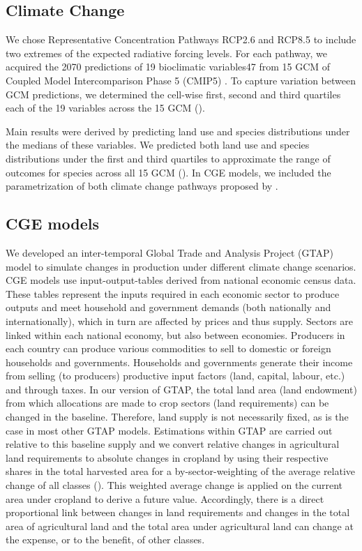\documentclass[titlesmallcaps,copyrightpage]{uomthesis}\usepackage[]{graphicx}\usepackage[]{color}
\begin{document}
\subsection{Climate Change} 
We chose Representative Concentration Pathways RCP2.6 and RCP8.5 \citep{van_vuuren_representative_2011} to include two extremes of the expected radiative forcing levels. For each pathway, we acquired the 2070 predictions of 19 bioclimatic variables47 from 15 GCM of Coupled Model Intercomparison Phase 5 (CMIP5) \citep{taylor_overview_2012}. To capture variation between GCM predictions, we determined the cell-wise first, second and third quartiles each of the 19 variables across the 15 GCM ().

Main results were derived by predicting land use and species distributions under the medians of these variables. We predicted both land use and species distributions under the first and third quartiles to approximate the range of outcomes for species across all 15 GCM (). In CGE models, we included the parametrization of both climate change pathways proposed by \citet{roson_estimation_2016}.

\subsection{CGE models} 
We developed an inter-temporal Global Trade and Analysis Project (GTAP) model \citep{hertel_global_1997} to simulate changes in production under different climate change scenarios. CGE models use input-output-tables derived from national economic census data. These tables represent the inputs required in each economic sector to produce outputs and meet household and government demands (both nationally and internationally), which in turn are affected by prices and thus supply. Sectors are linked within each national economy, but also between economies. Producers in each country can produce various commodities to sell to domestic or foreign households and governments. Households and governments generate their income from selling (to producers) productive input factors (land, capital, labour, etc.) and through taxes. In our version of GTAP, the total land area (land endowment) from which allocations are made to crop sectors (land requirements) can be changed in the baseline. Therefore, land supply is not necessarily fixed, as is the case in most other GTAP models.  
Estimations within GTAP are carried out relative to this baseline supply and we convert relative changes in agricultural land requirements to absolute changes in cropland by using their respective shares in the total harvested area for a by-sector-weighting of the average relative change of all classes (). This weighted average change is applied on the current area under cropland to derive a future value. Accordingly, there is a direct proportional link between changes in land requirements and changes in the total area of agricultural land and the total area under agricultural land can change at the expense, or to the benefit, of other classes. 
\end{document}
